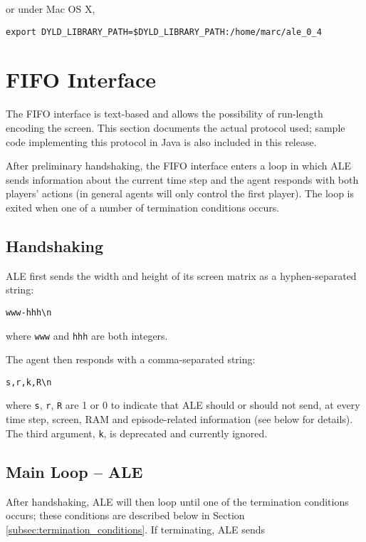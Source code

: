 \documentclass[12pt]{article}
\begin{document}
or under Mac OS X,

\begin{verbatim}
export DYLD_LIBRARY_PATH=$DYLD_LIBRARY_PATH:/home/marc/ale_0_4
\end{verbatim}

\section{FIFO Interface}\label{sec:pipes_interface}

The FIFO interface is text-based and allows the possibility of run-length encoding the screen. This section documents the actual protocol used; sample code implementing this protocol in Java is also included in this release.

After preliminary handshaking, the FIFO interface enters a loop in which ALE sends information about the current time step and the agent responds with both players' actions (in general agents will only control the first player). The loop is exited when one of a number of termination conditions occurs.

\subsection{Handshaking}

ALE first sends the width and height of its screen matrix as a hyphen-separated string:

\begin{verbatim}
www-hhh\n
\end{verbatim}

where \verb+www+ and \verb+hhh+ are both integers.

The agent then responds with a comma-separated string:

\begin{verbatim}
s,r,k,R\n
\end{verbatim}

where \verb+s+, \verb+r+, \verb+R+ are 1 or 0 to indicate that ALE should or should not send, at every time step, screen, RAM and episode-related information (see below for details). The third argument, \verb+k+, is deprecated and currently ignored.

\subsection{Main Loop -- ALE}

After handshaking, ALE will then loop until one of the termination conditions occurs; these conditions are described below in Section \ref{subsec:termination_conditions}. If terminating, ALE sends
\end{document}
